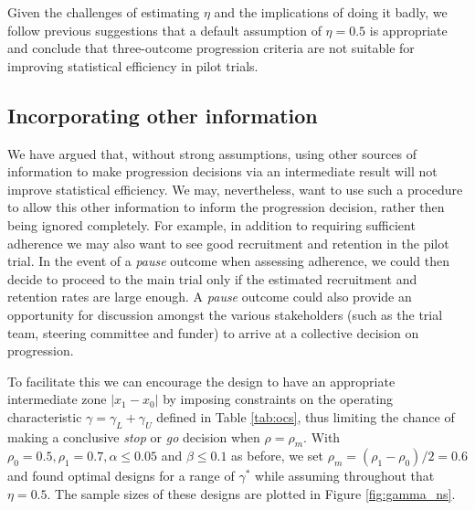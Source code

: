 \documentclass{bmcart}
\begin{document}

Given the challenges of estimating $\eta$ and the implications of doing it badly, we follow previous suggestions \cite{Sargent2001a, Dehbi2020} that a default assumption of $\eta = 0.5$ is appropriate and conclude that three-outcome progression criteria are not suitable for improving statistical efficiency in pilot trials.


\subsection{Incorporating other information}\label{sec:information}

We have argued that, without strong assumptions, using other sources of information to make progression decisions via an intermediate result will not improve statistical efficiency. We may, nevertheless, want to use such a procedure to allow this other information to inform the progression decision, rather then being ignored completely. For example, in addition to requiring sufficient adherence we may also want to see good recruitment and retention in the pilot trial. In the event of a \emph{pause} outcome when assessing adherence, we could then decide to proceed to the main trial only if the estimated recruitment and retention rates are large enough. A \emph{pause} outcome could also provide an opportunity for discussion amongst the various stakeholders (such as the trial team, steering committee and funder) to arrive at a collective decision on progression.

To facilitate this we can encourage the design to have an appropriate intermediate zone $| x_1 - x_0|$ by imposing constraints on the operating characteristic $\gamma = \gamma_L + \gamma_U$ defined in Table \ref{tab:ocs}, thus limiting the chance of making a conclusive \emph{stop} or \emph{go} decision when $\rho = \rho_m$. With $\rho_0 = 0.5, \rho_1 = 0.7, \alpha \leq 0.05$ and $\beta \leq 0.1$ as before, we set $\rho_m = (\rho_1 - \rho_0)/2 = 0.6$ and found optimal designs for a range of $\gamma^*$ while assuming throughout that $\eta = 0.5$. The sample sizes of these designs are plotted in Figure \ref{fig:gamma_ns}.
\end{document}
